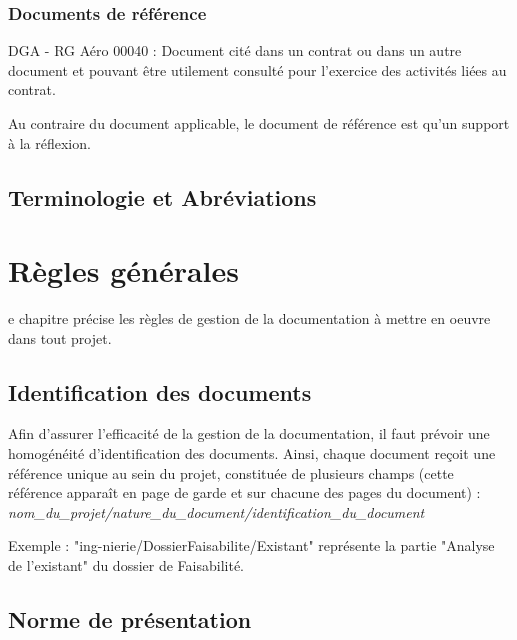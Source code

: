     \subsubsection{Documents de référence}
      DGA - RG Aéro 00040 : Document cité dans un contrat ou dans un autre document et pouvant être utilement consulté pour l'exercice des activités liées au contrat.
      \par Au contraire du document applicable, le document de référence est qu'un support à la réflexion. 
  \subsection{Terminologie et Abréviations}
\section{Règles générales}
e chapitre précise les règles de gestion de la documentation à mettre en oeuvre dans tout projet.
  \subsection{Identification des documents}
  Afin d’assurer l’efficacité de la gestion de la documentation, il faut prévoir une homogénéité d’identification des documents.
Ainsi, chaque document reçoit une référence unique au sein du projet, constituée de plusieurs champs (cette référence apparaît en page de garde et sur chacune des pages du document) :
\textit{nom\_du\_projet/nature\_du\_document/identification\_du\_document}

\par Exemple : "ing-nierie/DossierFaisabilite/Existant" représente la partie "Analyse de l'existant" du dossier de Faisabilité.

  \subsection{Norme de présentation}
